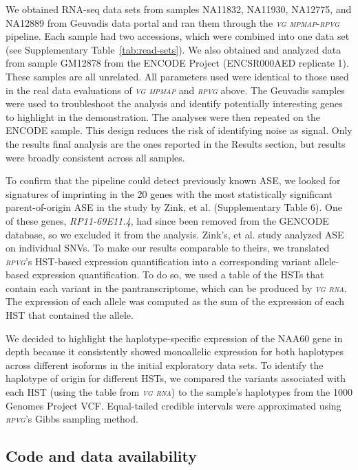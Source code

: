 \documentclass[11pt]{ucthesis}
\newcommand{\tool}[1]{\emph{\textsc{#1}}}
\begin{document}
We obtained RNA-seq data sets from samples NA11832, NA11930, NA12775, and NA12889 from Geuvadis data portal and ran them through the \tool{vg mpmap}-\tool{rpvg} pipeline. Each sample had two accessions, which were combined into one data set (see Supplementary Table~\ref{tab:read-sets}). We also obtained and analyzed data from sample GM12878 from the ENCODE Project (ENCSR000AED replicate 1)\cite{encode2012integrated}. These samples are all unrelated. All parameters used were identical to those used in the real data evaluations of \tool{vg mpmap} and \tool{rpvg} above. The Geuvadis samples were used to troubleshoot the analysis and identify potentially interesting genes to highlight in the demonstration. The analyses were then repeated on the ENCODE sample. This design reduces the risk of identifying noise as signal. Only the results final analysis are the ones reported in the Results section, but results were broadly consistent across all samples.

To confirm that the pipeline could detect previously known ASE, we looked for signatures of imprinting in the 20 genes with the most statistically significant parent-of-origin ASE in the study by Zink, et al. \cite{zink2018insights} (Supplementary Table 6). One of these genes, \emph{RP11-69E11.4}, had since been removed from the GENCODE database, so we excluded it from the analysis. Zink's, et al. study analyzed ASE on individual SNVs. To make our results comparable to theirs, we translated \tool{rpvg}'s HST-based expression quantification into a corresponding variant allele-based expression quantification. To do so, we used a table of the HSTs that contain each variant in the pantranscriptome, which can be produced by \tool{vg rna}. The expression of each allele was computed as the sum of the expression of each HST that contained the allele.

We decided to highlight the haplotype-specific expression of the NAA60 gene in depth because it consistently showed monoallelic expression for both haplotypes across different isoforms in the initial exploratory data sets. To identify the haplotype of origin for different HSTs, we compared the variants associated with each HST (using the table from \tool{vg rna}) to the sample's haplotypes from the 1000 Genomes Project VCF. Equal-tailed credible intervals were approximated using \tool{rpvg}'s Gibbs sampling method.

\subsection{Code and data availability}
\end{document}
